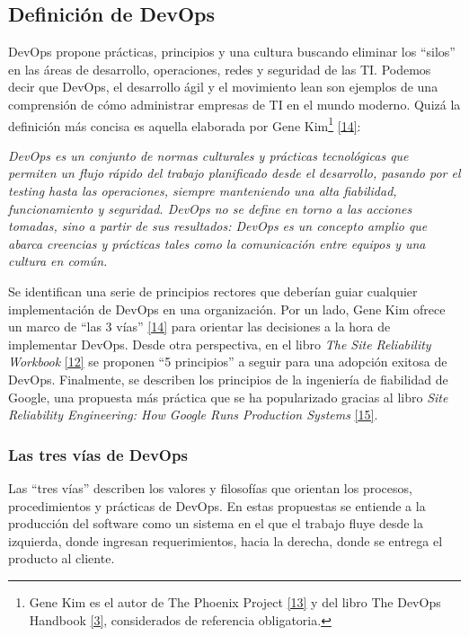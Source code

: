 \subsection{Definición de DevOps}

DevOps propone prácticas, principios y una cultura buscando eliminar los “silos” en las áreas de desarrollo, operaciones, redes y seguridad de las TI. Podemos decir que DevOps, el desarrollo ágil y el movimiento lean son ejemplos de una comprensión de cómo administrar empresas de TI en el mundo moderno. Quizá la definición más concisa es aquella elaborada por Gene Kim\footnote{ Gene Kim es el autor de The Phoenix Project \href{https://www.zotero.org/google-docs/?zpwL2d}{[13]} y del libro The DevOps Handbook \href{https://www.zotero.org/google-docs/?AT98ZF}{[3]}, considerados de referencia obligatoria.} \href{https://www.zotero.org/google-docs/?rf9r9p}{[14]}:

\textit{DevOps es un conjunto de normas culturales y prácticas tecnológicas que permiten un flujo rápido del trabajo planificado desde el desarrollo, pasando por el testing hasta las operaciones, siempre manteniendo una alta fiabilidad, funcionamiento y seguridad. DevOps no se define en torno a las acciones tomadas, sino a partir de sus resultados: DevOps es un concepto amplio que abarca creencias y prácticas tales como la comunicación entre equipos y una cultura en común.}

Se identifican una serie de principios rectores que deberían guiar cualquier implementación de DevOps en una organización. Por un lado, Gene Kim ofrece un marco de “las 3 vías” \href{https://www.zotero.org/google-docs/?Iiqrn7}{[14]} para orientar las decisiones a la hora de implementar DevOps. Desde otra perspectiva,  en el libro \textit{The Site Reliability Workbook} \href{https://www.zotero.org/google-docs/?5J7eFC}{[12]} se proponen “5 principios” a seguir para una adopción exitosa de DevOps. Finalmente, se describen los principios de la ingeniería de fiabilidad de Google, una propuesta más práctica que se ha popularizado gracias al libro \textit{Site Reliability Engineering: How Google Runs Production Systems} \href{https://www.zotero.org/google-docs/?5AQrRD}{[15]}.

\subsubsection{Las tres vías de DevOps}

Las “tres vías” describen los valores y filosofías que orientan los procesos, procedimientos y prácticas de DevOps. En estas propuestas se entiende a la producción del software como un sistema en el que el trabajo fluye desde la izquierda, donde ingresan requerimientos, hacia la derecha, donde se entrega el producto al cliente.

